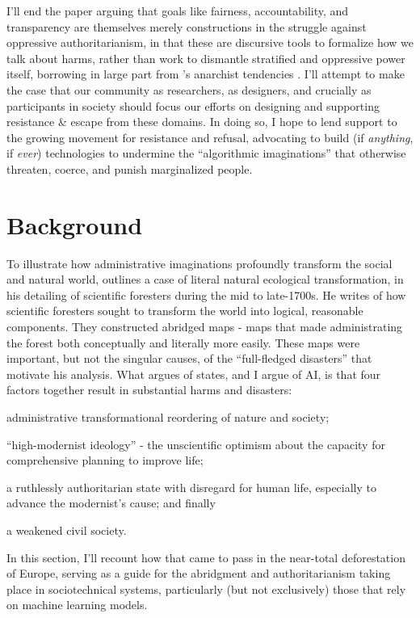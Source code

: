 \documentclass[manuscript,screen]{acmart}
\begin{document}
I'll end the paper arguing that goals like fairness, accountability, and transparency are themselves merely constructions in the struggle against oppressive authoritarianism, in that these are discursive tools to formalize how we talk about harms, rather than work to dismantle stratified and oppressive power itself, borrowing in large part from \citeauthor{graeber2015utopia}'s anarchist tendencies
\cite{graeber2015utopia}.
I'll attempt to make the case that our community as researchers, as designers, and crucially as participants in society should focus our efforts on designing and supporting resistance \& escape from these domains. In doing so, I hope to lend support to the growing movement for resistance and refusal, advocating to build (if \emph{anything}, if \emph{ever}) technologies to undermine the ``algorithmic imaginations'' that otherwise threaten, coerce, and punish marginalized people.

\section{Background}

To illustrate how administrative imaginations profoundly transform the social and natural world, \citeauthor{scott1998seeing} outlines a case of literal natural ecological transformation, in his detailing of scientific foresters during the mid to late-1700s.
He writes of how scientific foresters sought to transform the world into logical, reasonable components.
They constructed abridged maps - maps that made administrating the forest both conceptually and literally more easily.
These maps were important, but not the singular causes, of the ``full-fledged disasters'' that motivate his analysis.
What \citeauthor{scott1998seeing} argues of states, and I argue of AI, is that four factors together result in substantial harms and disasters: 
\begin{enumerate*}
\item administrative transformational reordering of nature and society;


\item ``high-modernist ideology'' - the unscientific optimism about the capacity for comprehensive planning to improve life;


\item a ruthlessly authoritarian state with disregard for human life, especially to advance the modernist's cause;
and finally 

\item a weakened civil society.
\end{enumerate*}
In this section, I'll recount how that came to pass in the near-total deforestation of Europe, serving as a guide for the abridgment and authoritarianism taking place in sociotechnical systems, particularly (but not exclusively) those that rely on machine learning models.
\end{document}
